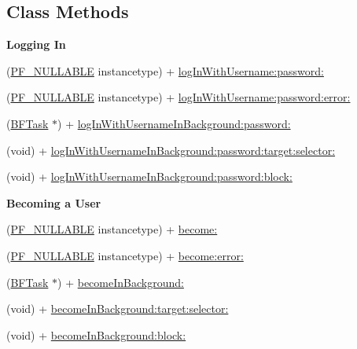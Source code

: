 \subsection*{Class Methods}
\begin{Indent}{\bf Logging In}\par
{\em 

 

 }\begin{DoxyCompactItemize}
\item 
(\hyperlink{_p_f_nullability_8h_a528d97a96c5fb279a45c378f5657fca2}{P\+F\+\_\+\+N\+U\+L\+L\+A\+B\+L\+E} instancetype) + \hyperlink{interface_p_f_user_afe5679630a84b1303f8b13bb0582eb93}{log\+In\+With\+Username\+:password\+:}
\item 
(\hyperlink{_p_f_nullability_8h_a528d97a96c5fb279a45c378f5657fca2}{P\+F\+\_\+\+N\+U\+L\+L\+A\+B\+L\+E} instancetype) + \hyperlink{interface_p_f_user_a53541c9d7306ba65e6737aa78981dc62}{log\+In\+With\+Username\+:password\+:error\+:}
\item 
(\hyperlink{interface_b_f_task}{B\+F\+Task} $\ast$) + \hyperlink{interface_p_f_user_a3459ba1d8751da2c937ac95293ceac1f}{log\+In\+With\+Username\+In\+Background\+:password\+:}
\item 
(void) + \hyperlink{interface_p_f_user_a1b5d12f5d0229308da387929da5f7091}{log\+In\+With\+Username\+In\+Background\+:password\+:target\+:selector\+:}
\item 
(void) + \hyperlink{interface_p_f_user_ad1c0cf2be24deeca2e2a3b71c0ee1e39}{log\+In\+With\+Username\+In\+Background\+:password\+:block\+:}
\end{DoxyCompactItemize}
\end{Indent}
\begin{Indent}{\bf Becoming a User}\par
{\em 

 

 }\begin{DoxyCompactItemize}
\item 
(\hyperlink{_p_f_nullability_8h_a528d97a96c5fb279a45c378f5657fca2}{P\+F\+\_\+\+N\+U\+L\+L\+A\+B\+L\+E} instancetype) + \hyperlink{interface_p_f_user_afe2ccc3b14ab2a97c87ac87c31f1ec8c}{become\+:}
\item 
(\hyperlink{_p_f_nullability_8h_a528d97a96c5fb279a45c378f5657fca2}{P\+F\+\_\+\+N\+U\+L\+L\+A\+B\+L\+E} instancetype) + \hyperlink{interface_p_f_user_a92e7f395b3e70083c36947677078e463}{become\+:error\+:}
\item 
(\hyperlink{interface_b_f_task}{B\+F\+Task} $\ast$) + \hyperlink{interface_p_f_user_a90dee806562c7afb60298e191b92fe1b}{become\+In\+Background\+:}
\item 
(void) + \hyperlink{interface_p_f_user_a18bcb89943d13fd5e23e9530fe766995}{become\+In\+Background\+:target\+:selector\+:}
\item 
(void) + \hyperlink{interface_p_f_user_ac3781f75375d93f9e642a4fd3fced336}{become\+In\+Background\+:block\+:}
\end{DoxyCompactItemize}
\end{Indent}
